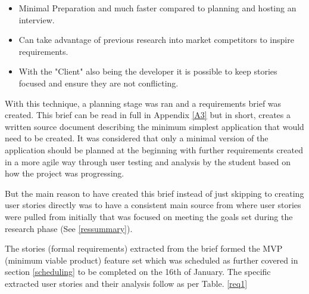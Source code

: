 \begin{itemize}
    \item Minimal Preparation and much faster compared to planning and hosting an interview.
    \item Can take advantage of previous research into market competitors to inspire requirements.
    \item With the "Client" also being the developer it is possible to keep stories focused and ensure they are not conflicting.
\end{itemize}

With this technique, a planning stage was ran and a requirements brief was created. This brief can be read in full in Appendix \ref{A3} but in short, creates a written source document describing the minimum simplest application that would need to be created. It was considered that only a minimal version of the application should be planned at the beginning with further requirements created in a more agile way through user testing and analysis by the student based on how the project was progressing.

But the main reason to have created this brief instead of just skipping to creating user stories directly was to have a consistent main source from where user stories were pulled from initially that was focused on meeting the goals set during the research phase (See \ref{ressummary}).

The stories (formal requirements) extracted from the brief formed the MVP (minimum viable product) feature set which was scheduled as further covered in section \ref{scheduling} to be completed on the 16th of January. The specific extracted user stories and their analysis follow as per Table. \ref{req1}

